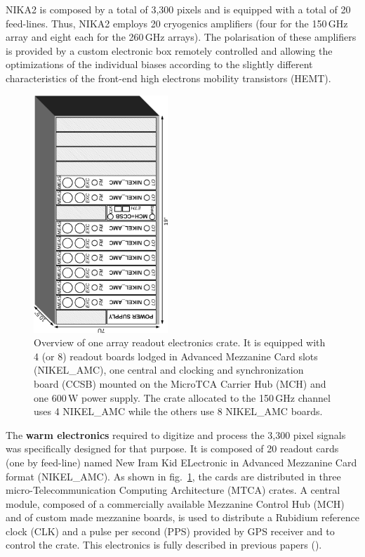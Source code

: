 \documentclass[]{aa} %
\begin{document}
NIKA2 is composed by a total of 3,300 pixels and is equipped with a total of 20 feed-lines. Thus, NIKA2 employs 20 cryogenics amplifiers (four for the 150\,GHz array and eight each for the 260\,GHz arrays). The polarisation of these amplifiers is provided by a custom electronic box remotely controlled and allowing the optimizations of the individual biases according to the slightly different characteristics of the front-end high electrons mobility transistors (HEMT). 

\begin{figure}
\begin{center}
\includegraphics[angle=-90,width=0.45\textwidth]{NIKA_crate}
\caption{Overview of one array readout electronics crate.
It is equipped with 4 (or 8) readout boards lodged in Advanced Mezzanine Card slots (NIKEL\_AMC), one central and clocking and synchronization board (CCSB) mounted on the MicroTCA Carrier Hub (MCH) and one 600\,W power supply.
The crate allocated to the 150\,GHz channel uses 4 NIKEL\_AMC while the others use 8 NIKEL\_AMC boards.
\label{crateFig}}
\end{center}
\end{figure}

The \textbf{warm electronics} required to digitize and process the 3,300 pixel signals was specifically designed for that purpose.
It is composed of 20 readout cards (one by feed-line) named New Iram Kid ELectronic in Advanced Mezzanine Card format (NIKEL\_AMC).
As shown in fig.~\ref{crateFig}, the cards are distributed in three micro-Telecommunication Computing Architecture (MTCA) crates.
A central module, composed of a commercially available Mezzanine Control Hub (MCH) and of custom made mezzanine boards, is used to distribute a Rubidium reference clock (CLK) and a pulse per second (PPS) provided by GPS receiver and to control the crate.
This electronics is fully described in previous papers (\cite{Bourrion2012,Bourrion2016}).
\end{document}

